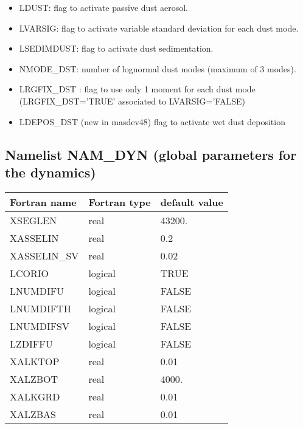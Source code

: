 \begin{itemize}

\item LDUST: flag to activate passive dust aerosol.
\item LVARSIG: flag to activate variable standard deviation for each dust mode.
\item LSEDIMDUST: flag to activate dust sedimentation.
\item  NMODE\_DST: number of lognormal dust modes (maximum of 3 modes).
\item LRGFIX\_DST : flag to use only 1 moment for each dust mode (LRGFIX\_DST='TRUE' associated to LVARSIG='FALSE)
\item LDEPOS\_DST (new in masdev48) flag to activate wet dust deposition  
\end{itemize}
\subsection{Namelist NAM\_DYN (global parameters for the dynamics)}

\begin{center}
\begin{tabular} {|l|l|l|}
\hline
Fortran name & Fortran type & default value \\
\hline
XSEGLEN     &  real   & 43200.   \\
XASSELIN    & real    & 0.2      \\
XASSELIN\_SV & real    & 0.02     \\
LCORIO      & logical & TRUE     \\
LNUMDIFU    & logical & FALSE    \\
LNUMDIFTH   & logical & FALSE    \\
LNUMDIFSV   & logical & FALSE    \\
LZDIFFU     & logical & FALSE    \\
XALKTOP     & real    & 0.01     \\
XALZBOT     & real    & 4000.    \\
XALKGRD     & real    & 0.01     \\
XALZBAS     & real    & 0.01     \\
\hline 
\end{tabular}
\end{center}



